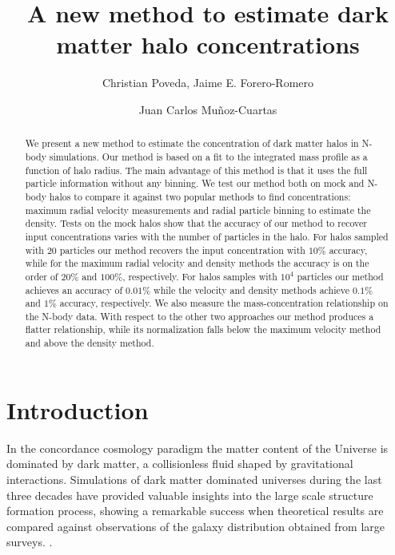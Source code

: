 \documentclass{emulateapj}
\begin{document}
\title{A new method to estimate dark matter halo concentrations}


\author{Christian Poveda, Jaime E. Forero-Romero}
\author{Juan Carlos Mu\~noz-Cuartas}


\begin{abstract}

We present a new method to estimate the concentration of dark matter
halos in N-body simulations.
Our method is based on a fit to the integrated mass profile as a function of
halo radius.
The main advantage of this method is that it uses the full particle information
without any binning.
We test our method both on mock and N-body halos to compare it against
two popular methods to find concentrations: maximum radial velocity
measurements and radial particle binning to estimate the density.
Tests on the mock halos show that the accuracy of our method to
recover input concentrations varies with the number of particles in
the halo. For halos sampled with $20$ particles our method recovers
the input concentration with $10\%$ accuracy, while for the maximum
radial velocity and density methods the accuracy is on the order of $20\%$ and
$100\%$, respectively. For halos samples with $10^4$ particles our
method achieves an accuracy of $0.01\%$ while the velocity and density
methods achieve $0.1\%$ and $1\%$ accuracy, respectively.
We also measure the mass-concentration relationship on the N-body
data.
With respect to the other two approaches our method produces a
flatter relationship, while its normalization falls below the maximum
velocity method and above the density method.
\end{abstract}



\section{Introduction}
\label{sec:introduction}
In the concordance cosmology paradigm the matter content of the
Universe is dominated by dark matter, a collisionless fluid shaped by
gravitational interactions.
Simulations of dark matter dominated universes during the last three
decades have provided valuable insights into the large scale structure
formation process, showing a remarkable success when theoretical
results are compared against observations of the galaxy distribution
obtained from large surveys.
\citep{Springel2005,2011ApJ...740..102K}.
\end{document}
